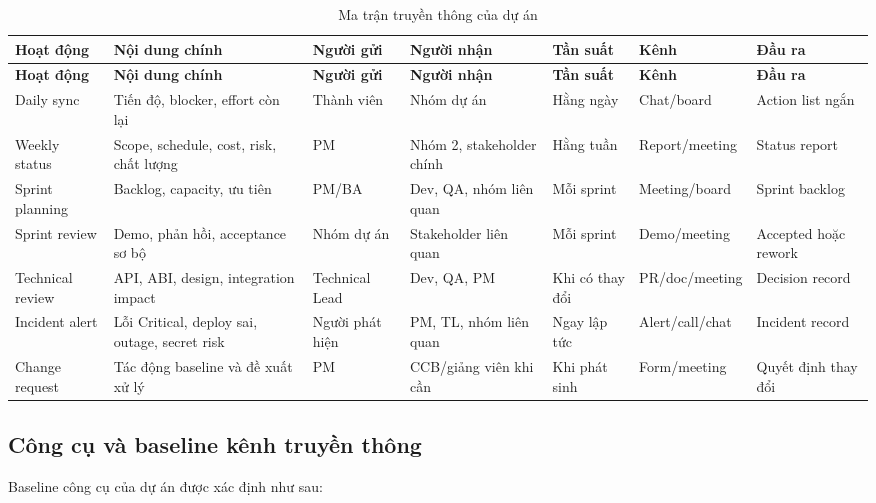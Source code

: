 \begin{landscape}
\small
\begin{longtable}{| p{2.4cm} | p{3.2cm} | p{2cm} | p{2.4cm} | p{1.6cm} | p{1.8cm} | p{2.4cm} |}
\caption{Ma trận truyền thông của dự án}\label{tab:communication-matrix}\\
\hline
\textbf{Hoạt động} & \textbf{Nội dung chính} & \textbf{Người gửi} & \textbf{Người nhận} & \textbf{Tần suất} & \textbf{Kênh} & \textbf{Đầu ra} \\
\hline
\endfirsthead
\hline
\textbf{Hoạt động} & \textbf{Nội dung chính} & \textbf{Người gửi} & \textbf{Người nhận} & \textbf{Tần suất} & \textbf{Kênh} & \textbf{Đầu ra} \\
\hline
\endhead
Daily sync & Tiến độ, blocker, effort còn lại & Thành viên & Nhóm dự án & Hằng ngày & Chat/board & Action list ngắn \\ \hline
Weekly status & Scope, schedule, cost, risk, chất lượng & PM & Nhóm 2, stakeholder chính & Hằng tuần & Report/meeting & Status report \\ \hline
Sprint planning & Backlog, capacity, ưu tiên & PM/BA & Dev, QA, nhóm liên quan & Mỗi sprint & Meeting/board & Sprint backlog \\ \hline
Sprint review & Demo, phản hồi, acceptance sơ bộ & Nhóm dự án & Stakeholder liên quan & Mỗi sprint & Demo/meeting & Accepted hoặc rework \\ \hline
Technical review & API, ABI, design, integration impact & Technical Lead & Dev, QA, PM & Khi có thay đổi & PR/doc/meeting & Decision record \\ \hline
Incident alert & Lỗi Critical, deploy sai, outage, secret risk & Người phát hiện & PM, TL, nhóm liên quan & Ngay lập tức & Alert/call/chat & Incident record \\ \hline
Change request & Tác động baseline và đề xuất xử lý & PM & CCB/giảng viên khi cần & Khi phát sinh & Form/meeting & Quyết định thay đổi \\
\hline
\end{longtable}
\end{landscape}
\normalsize

\subsection{Công cụ và baseline kênh truyền thông}

Baseline công cụ của dự án được xác định như sau:

